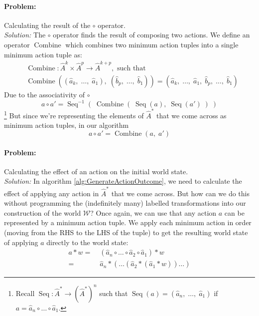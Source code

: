 \paragraph{Problem:}
Calculating the result of the $\circ$ operator.
\\\textit{Solution:}
The $\circ$ operator finds the result of composing two actions.
We define an operator $\operatorname{Combine}$ which combines two minimum action tuples into a single minimum action tuple as:
\begin{equation}
	\begin{aligned}
		 & \operatorname{Combine}: \hat{A}^{k} \times \hat{A}^{p} \to \hat{A}^{k+p}, \text{ such that}                                                                                                     \\
		 & \operatorname{Combine}((\hat{a}_{k}, \; \dots, \; \hat{a}_{1}), \; (\hat{b}_{p}, \; \dots, \; \hat{b}_{1})) = (\hat{a}_{k}, \; \dots, \; \hat{a}_{1}, \; \hat{b}_{p}, \; \dots, \; \hat{b}_{1})
	\end{aligned}
\end{equation}
Due to the associativity of $\circ$
\begin{equation}
	a \circ a' = \operatorname{Seq}^{-1}(\;\operatorname{Combine}(\;\operatorname{Seq}(a), \; \operatorname{Seq}(a')\;)\;)
\end{equation}
\footnote{
	Recall $\operatorname{Seq}: \hat{A}^{*} \to (\hat{A}^{*})^{n}$ such that $\operatorname{Seq}(a) = (\hat{a}_{n}, \; \dots, \; \hat{a}_{1})$ if $a = \hat{a}_{n} \circ \dots \circ \hat{a}_{1}$.
}
But since we're representing the elements of $\hat{A}^{*}$ that we come across as minimum action tuples, in our algorithm
\begin{equation}
	a \circ a' = \operatorname{Combine}(a, \; a')
\end{equation}

\paragraph{Problem:}
Calculating the effect of an action on the initial world state.
\\\textit{Solution:}
In algorithm \ref{alg:GenerateActionOutcome}, we need to calculate the effect of applying any action in $\hat{A}^{*}$ that we come across.
But how can we do this without programming the (indefinitely many) labelled transformations into our construction of the world $\mathscr{W}$?
Once again, we can use that any action $a$ can be represented by a minimum action tuple.
We apply each minimum action in order (moving from the RHS to the LHS of the tuple) to get the resulting world state of applying $a$ directly to the world state:
\begin{equation}
	\begin{aligned}
		a * w = & \; (\hat{a}_{n} \circ \dots \circ \hat{a}_{2} \circ \hat{a}_{1}) * w \\
		= & \; \hat{a}_{n} * ( \dots (\hat{a}_{2} * (\hat{a}_{1} * w)) \dots)
	\end{aligned}
\end{equation}




